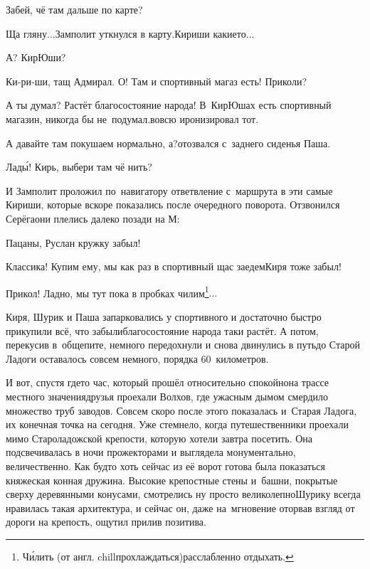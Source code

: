 \diagdash Забей, чё там дальше по карте?

\diagdash Ща гляну$\ldots$\mdash Замполит уткнулся в карту.\mdash Кириши какие\sdash то$\ldots$

\diagdash А? КирЮши?

\diagdash Ки-ри-ши, тащ Адмирал. О! Там и спортивный магаз есть! Приколи?

\diagdash А ты думал? Растёт благосостояние народа! В~КирЮшах есть спортивный магазин, никогда бы не~подумал.\mdash вовсю иронизировал тот.

\diagdash А давайте там покушаем нормально, а?\mdash отозвался с~заднего сиденья Паша.

\diagdash Лад\'{ы}! Кирь, выбери там чё нить?

И Замполит проложил по~навигатору ответвление с~маршрута в эти самые Кириши, которые вскоре показались после очередного поворота. Отзвонился Серёга\mdash они плелись далеко позади на М:

\diagdash Пацаны, Руслан кружку забыл!

\diagdash Классика! Купим ему, мы как раз в спортивный щас заедем\mdash Киря тоже забыл!

\renewcommand*{\thefootnote}{\fnsymbol{footnote}}
\setcounter{footnote}{0}
\diagdash Прикол! Ладно, мы тут пока в пробках чилим\footnote{Ч\'{и}лить (от англ. chill\mdash прохлаждаться)\mdash расслабленно отдыхать.}$\ldots$

Киря, Шурик и Паша запарковались у спортивного и достаточно быстро прикупили всё, что забыли\mdash благосостояние народа таки растёт. А потом, перекусив в~общепите, немного передохнули и снова двинулись в путь\mdash до Старой Ладоги оставалось совсем немного, порядка 60~километров.

И вот, спустя где\sdash то час, который прошёл относительно спокойно\mdash на трассе местного значения\mdash друзья проехали Волхов, где ужасным дымом смердило множество труб заводов. Совсем скоро после этого показалась и~Старая Ладога, их конечная точка на сегодня. Уже стемнело, когда путешественники проехали мимо Староладожской крепости, которую хотели завтра посетить. Она подсвечивалась в ночи прожекторами и выглядела монументально, величественно. Как будто хоть сейчас из её ворот готова была показаться княжеская конная дружина. Высокие крепостные стены и~башни, покрытые сверху деревянными конусами, смотрелись ну просто великолепно\mdash Шурику всегда нравилась такая архитектура, и сейчас он, даже на~мгновение оторвав взгляд от дороги на крепость, ощутил прилив позитива. 

